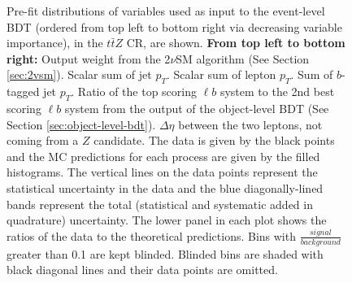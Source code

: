 \begin{figure}[htbp]
\caption{Pre-fit distributions of variables used as input to the event-level BDT (ordered from top left to bottom right via decreasing variable importance), in the $t\bar{t}Z$ CR, are shown. \textbf{From top left to bottom right:} Output weight from the 2$\nu$SM algorithm (See Section \ref{sec:2vsm}). Scalar sum of jet $p_{T}$. Scalar sum of lepton $p_{T}$. Sum of $b$-tagged jet $p_{T}$. Ratio of the top scoring $\ell b$ system to the 2nd best scoring $\ell b$ system from the output of the object-level BDT (See Section \ref{sec:object-level-bdt}). $\Delta \eta$ between the two leptons, not coming from a $Z$ candidate. The data is given by the black points and the MC predictions for each process are given by the filled histograms. The vertical lines on the data points represent the statistical uncertainty in the data and the blue diagonally-lined bands represent the total (statistical and systematic added in quadrature) uncertainty. The lower panel in each plot shows the ratios of the data to the theoretical predictions. Bins with $\frac{signal}{background}$ greater than 0.1 are kept blinded. Blinded bins are shaded with black diagonal lines and their data points are omitted.}
  \label{fig:4lep-ttZCR-eventbdt-vars}
\end{figure}



